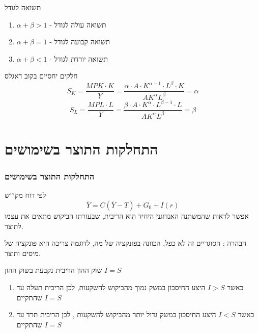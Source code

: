 \documentclass[usenames,dvipsnames,10pt]{beamer}
\begin{document}
\begin{RTL}
\begin{frame}[allowframebreaks]
        \begin{block}{תשואה לגודל}
            \begin{enumerate}
                \item $\alpha + \beta > 1 $ -  תשואה עולה לגודל
                \item $\alpha + \beta = 1 $ -  תשואה קבועה לגודל
                \item $\alpha + \beta < 1 $ -  תשואה יורדת לגודל
            \end{enumerate}
        \end{block}
    
        \framebreak

        \begin{block}{חלקים יחסיים בקוב דאגלס}
            $$S_K = \frac{MPK \cdot K}{Y} = \frac{\alpha \cdot A \cdot K^{\alpha - 1} \cdot L^\beta \cdot K}{AK^\alpha L^\beta} = \alpha$$
            $$S_L = \frac{MPL \cdot L}{Y} = \frac{\beta \cdot A \cdot K^{\alpha} \cdot L^{\beta - 1 } \cdot L }{AK^\alpha L^\beta} = \beta$$
        \end{block}

    \end{frame}


    \section{התחלקות התוצר בשימושים}
    \begin{frame}[allowframebreaks]
        \frametitle{התחלקות התוצר בשימושים}
        \begin{block}{לפי דוח מקו''ש}
        $$\overline Y = C(\overline Y - T) + G_0 + I(r)$$  
        אפשר לראות שהמשתנה האנדוגני היחיד הוא הריבית, שבעזרתו הביקוש מתאים את עצמו לתוצר.      
        \end{block}
        הבהרה : הסוגריים זה לא כפל, הכוונה בפונקציה של מה, לדוגמה צריכה היא פונקציה של מיסים ותוצר.
        
        \begin{block}{שוק ההון}
            הריבית נקבעת בשוק ההון $I = S$
            \begin{enumerate}
                \item כאשר $I > S$ היצע החיסכון במשק נמוך מהביקוש להשקעות, לכן הריבית תעלה עד שהתקיים $I = S$
                \item כאשר $I < S$ היצע החיסכון במשק גדול יותר מהביקוש להשקעות , לכן הריבית תרד עד שהתקיים $I = S$
            \end{enumerate}
        \end{block}


\end{frame}
\end{RTL}
\end{document}

